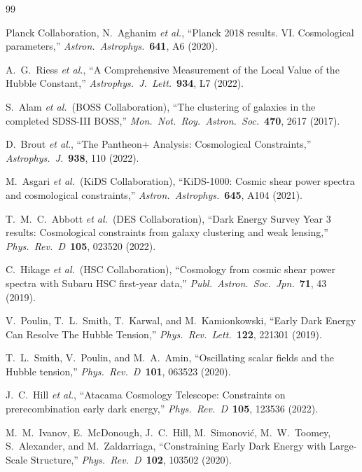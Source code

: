 \documentclass[aps,prd,twocolumn,superscriptaddress,nofootinbib]{revtex4-2}
\begin{document}
\begin{thebibliography}{99}

Planck Collaboration, N.~Aghanim \emph{et al.},
``Planck 2018 results. VI. Cosmological parameters,''
\emph{Astron.\ Astrophys.}\ \textbf{641}, A6 (2020).

A.~G.~Riess \emph{et al.},
``A Comprehensive Measurement of the Local Value of the Hubble Constant,''
\emph{Astrophys.\ J.\ Lett.}\ \textbf{934}, L7 (2022).

S.~Alam \emph{et al.}\ (BOSS Collaboration),
``The clustering of galaxies in the completed SDSS-III BOSS,''
\emph{Mon.\ Not.\ Roy.\ Astron.\ Soc.}\ \textbf{470}, 2617 (2017).

D.~Brout \emph{et al.},
``The Pantheon+ Analysis: Cosmological Constraints,''
\emph{Astrophys.\ J.}\ \textbf{938}, 110 (2022).

M.~Asgari \emph{et al.}\ (KiDS Collaboration),
``KiDS-1000: Cosmic shear power spectra and cosmological constraints,''
\emph{Astron.\ Astrophys.}\ \textbf{645}, A104 (2021).

T.~M.~C.~Abbott \emph{et al.}\ (DES Collaboration),
``Dark Energy Survey Year 3 results: Cosmological constraints from 
galaxy clustering and weak lensing,''
\emph{Phys.\ Rev.\ D}\ \textbf{105}, 023520 (2022).

C.~Hikage \emph{et al.}\ (HSC Collaboration),
``Cosmology from cosmic shear power spectra with Subaru HSC first-year 
data,''
\emph{Publ.\ Astron.\ Soc.\ Jpn.}\ \textbf{71}, 43 (2019).

V.~Poulin, T.~L.~Smith, T.~Karwal, and M.~Kamionkowski,
``Early Dark Energy Can Resolve The Hubble Tension,''
\emph{Phys.\ Rev.\ Lett.}\ \textbf{122}, 221301 (2019).

T.~L.~Smith, V.~Poulin, and M.~A.~Amin,
``Oscillating scalar fields and the Hubble tension,''
\emph{Phys.\ Rev.\ D}\ \textbf{101}, 063523 (2020).

J.~C.~Hill \emph{et al.},
``Atacama Cosmology Telescope: Constraints on prerecombination early 
dark energy,''
\emph{Phys.\ Rev.\ D}\ \textbf{105}, 123536 (2022).

M.~M.~Ivanov, E.~McDonough, J.~C.~Hill, M.~Simonovi\'c, M.~W.~Toomey,
S.~Alexander, and M.~Zaldarriaga,
``Constraining Early Dark Energy with Large-Scale Structure,''
\emph{Phys.\ Rev.\ D}\ \textbf{102}, 103502 (2020).


\end{thebibliography}
\end{document}
